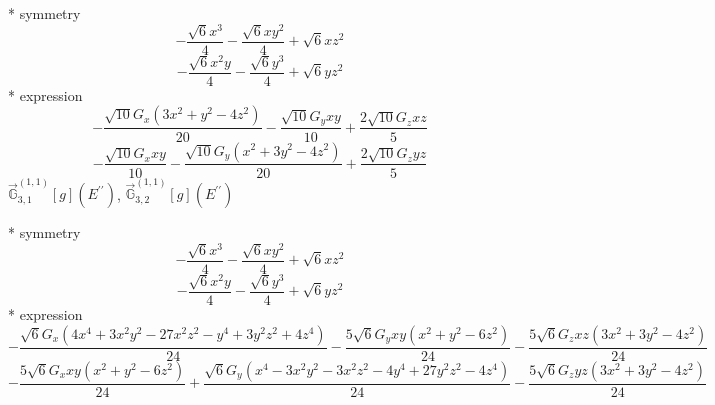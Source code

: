 \documentclass[fleqn,8pt]{jsarticle}
\begin{document}
\noindent\quad ** symmetry
\begin{dmath*}
- \frac{\sqrt{6} x^{3}}{4} - \frac{\sqrt{6} x y^{2}}{4} + \sqrt{6} x z^{2}
\end{dmath*}
\begin{dmath*}
- \frac{\sqrt{6} x^{2} y}{4} - \frac{\sqrt{6} y^{3}}{4} + \sqrt{6} y z^{2}
\end{dmath*}
\noindent\quad ** expression
\begin{dmath*}
- \frac{\sqrt{10} G_{x} \left(3 x^{2} + y^{2} - 4 z^{2}\right)}{20} - \frac{\sqrt{10} G_{y} x y}{10} + \frac{2 \sqrt{10} G_{z} x z}{5}
\end{dmath*}
\begin{dmath*}
- \frac{\sqrt{10} G_{x} x y}{10} - \frac{\sqrt{10} G_{y} \left(x^{2} + 3 y^{2} - 4 z^{2}\right)}{20} + \frac{2 \sqrt{10} G_{z} y z}{5}
\end{dmath*}
\noindent\quad $\vec{\mathbb{G}}_{3,1}^{(1,1)}[g](E^{\prime\prime})$, $\vec{\mathbb{G}}_{3,2}^{(1,1)}[g](E^{\prime\prime})$

\noindent\quad ** symmetry
\begin{dmath*}
- \frac{\sqrt{6} x^{3}}{4} - \frac{\sqrt{6} x y^{2}}{4} + \sqrt{6} x z^{2}
\end{dmath*}
\begin{dmath*}
- \frac{\sqrt{6} x^{2} y}{4} - \frac{\sqrt{6} y^{3}}{4} + \sqrt{6} y z^{2}
\end{dmath*}
\noindent\quad ** expression
\begin{dmath*}
- \frac{\sqrt{6} G_{x} \left(4 x^{4} + 3 x^{2} y^{2} - 27 x^{2} z^{2} - y^{4} + 3 y^{2} z^{2} + 4 z^{4}\right)}{24} - \frac{5 \sqrt{6} G_{y} x y \left(x^{2} + y^{2} - 6 z^{2}\right)}{24} - \frac{5 \sqrt{6} G_{z} x z \left(3 x^{2} + 3 y^{2} - 4 z^{2}\right)}{24}
\end{dmath*}
\begin{dmath*}
- \frac{5 \sqrt{6} G_{x} x y \left(x^{2} + y^{2} - 6 z^{2}\right)}{24} + \frac{\sqrt{6} G_{y} \left(x^{4} - 3 x^{2} y^{2} - 3 x^{2} z^{2} - 4 y^{4} + 27 y^{2} z^{2} - 4 z^{4}\right)}{24} - \frac{5 \sqrt{6} G_{z} y z \left(3 x^{2} + 3 y^{2} - 4 z^{2}\right)}{24}
\end{dmath*}
\end{document}
